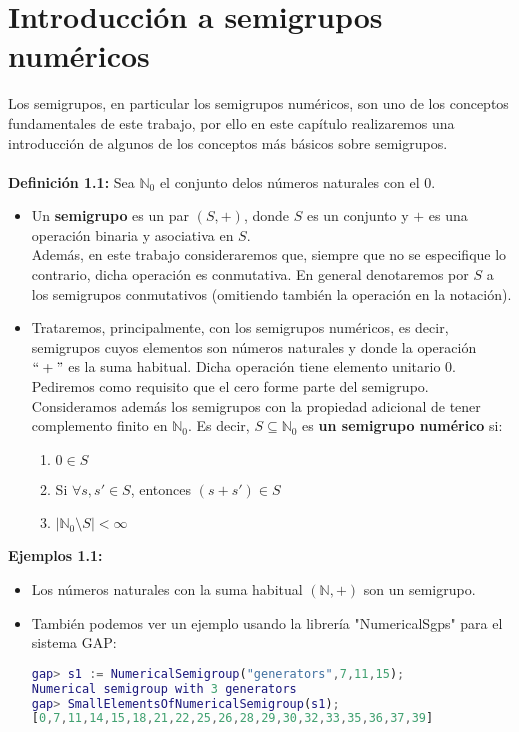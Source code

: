 \documentclass[11pt,spanish]{book}
\begin{document}
\chapter{Introducción a semigrupos numéricos}
Los semigrupos, en particular los semigrupos numéricos, son uno de los conceptos fundamentales de este trabajo, por ello en este capítulo realizaremos una introducción de algunos de los conceptos más básicos sobre semigrupos.\\
\\ \textbf{Definición 1.1:} Sea $\mathbb{N}_0$ el conjunto delos números naturales con el $0$.
\begin{itemize}
    \item Un \textbf{semigrupo} es un par $(S, +)$, donde $S$ es un conjunto y $\textbf{+}$ es una operación binaria y asociativa en $S$.\\ Además, en este trabajo  consideraremos que, siempre que no se especifique lo contrario, dicha operación es conmutativa. En general denotaremos por $S$ a los semigrupos conmutativos (omitiendo también la operación en la notación).
    \item Trataremos, principalmente, con los semigrupos numéricos, es decir, semigrupos cuyos elementos son números naturales y donde la operación $``+"$ es la suma habitual. Dicha operación tiene elemento unitario $0$. Pediremos como requisito que el cero forme parte del semigrupo. Consideramos además los semigrupos con la propiedad adicional de tener complemento finito en $\mathbb{N}_0$. Es decir, $S\subseteq\mathbb{N}_0$ es \textbf{un semigrupo numérico} si:
    \begin{enumerate}
        \item $0\in S$
        \item Si $\forall s, s'\in S$, entonces $(s+s')\in S$
        \item $|\mathbb{N}_0\setminus S|<\infty$
    \end{enumerate}
\end{itemize}
\textbf{Ejemplos 1.1:} 
\begin{itemize}
	\item Los números naturales con la suma habitual $(\mathbb{N}, +)$ son un semigrupo.
	\item También podemos ver un ejemplo usando la librería "NumericalSgps" para el sistema GAP:\\
\begin{lstlisting}[language=gap]
gap> s1 := NumericalSemigroup("generators",7,11,15);
Numerical semigroup with 3 generators
gap> SmallElementsOfNumericalSemigroup(s1);
[0,7,11,14,15,18,21,22,25,26,28,29,30,32,33,35,36,37,39]
\end{lstlisting}
\end{itemize}
\end{document}

